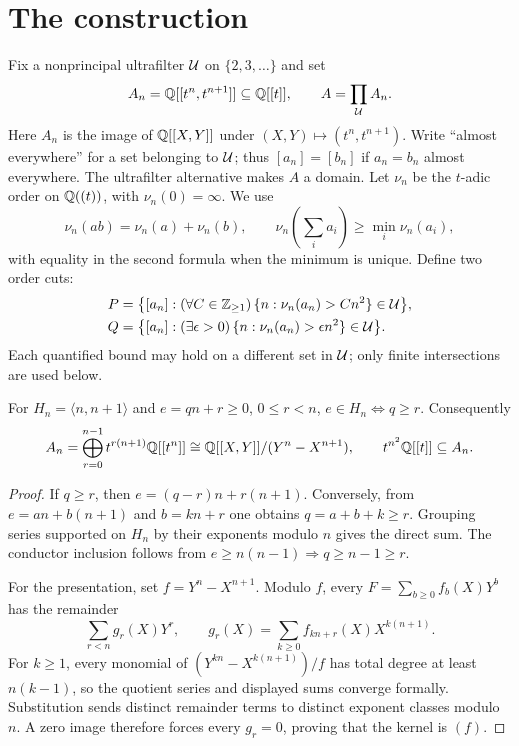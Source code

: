 \section{The construction}\label{sec:construction}

Fix a nonprincipal ultrafilter $\mathcal U$ on $\{2,3,\ldots\}$ and set
\[
 A_n=\mathbb Q[[t^n,t^{n+1}]]\subseteq\mathbb Q[[t]],\qquad
 A=\prod_{\mathcal U}A_n.
\]
Here $A_n$ is the image of $\mathbb Q[[X,Y]]$ under
$(X,Y)\mapsto(t^n,t^{n+1})$. Write ``almost everywhere'' for a set
belonging to $\mathcal U$; thus $[a_n]=[b_n]$ if $a_n=b_n$ almost everywhere.
The ultrafilter alternative makes $A$ a domain. Let $\nu_n$ be the
$t$-adic order on $\mathbb Q((t))$, with $\nu_n(0)=\infty$. We use
\[
 \nu_n(ab)=\nu_n(a)+\nu_n(b),\qquad
 \nu_n\!\left(\sum_i a_i\right)\geq\min_i\nu_n(a_i),
\]
with equality in the second formula when the minimum is unique.
Define two order cuts:
\begin{align}
 P&=\bigl\{[a_n]:(\forall C\in\mathbb Z_{\geq1})\,
                  \{n:\nu_n(a_n)>Cn^2\}\in\mathcal U\bigr\},\label{eq:P}\\
 Q&=\bigl\{[a_n]:(\exists\epsilon>0)\,
                  \{n:\nu_n(a_n)>\epsilon n^2\}\in\mathcal U\bigr\}.
                  \label{eq:Q}
\end{align}
Each quantified bound may hold on a different set in $\mathcal U$; only
finite intersections are used below.

\begin{lemma}\label{lem:curves}
For $H_n=\langle n,n+1\rangle$ and $e=qn+r\geq0$, $0\leq r<n$,
$e\in H_n\Longleftrightarrow q\geq r$. Consequently
\begin{equation}\label{eq:curve-facts}
 A_n=\bigoplus_{r=0}^{n-1}t^{r(n+1)}\mathbb Q[[t^n]]
 \cong\mathbb Q[[X,Y]]/(Y^n-X^{n+1}),\qquad
 t^{n^2}\mathbb Q[[t]]\subseteq A_n.
\end{equation}
\end{lemma}
\begin{proof}
If $q\geq r$, then $e=(q-r)n+r(n+1)$. Conversely, from
$e=an+b(n+1)$ and $b=kn+r$ one obtains $q=a+b+k\geq r$.
Grouping series supported on $H_n$ by their exponents modulo $n$
gives the direct sum. The conductor inclusion follows from
$e\geq n(n-1)\Rightarrow q\geq n-1\geq r$.

For the presentation, set $f=Y^n-X^{n+1}$. Modulo $f$, every
$F=\sum_{b\geq0}f_b(X)Y^b$ has the remainder
\[
 \sum_{r<n}g_r(X)Y^r,\qquad
 g_r(X)=\sum_{k\geq0}f_{kn+r}(X)X^{k(n+1)}.
\]
For $k\geq1$, every monomial of $(Y^{kn}-X^{k(n+1)})/f$ has total
degree at least $n(k-1)$, so the quotient series and displayed sums
converge formally. Substitution sends distinct remainder terms to distinct
exponent classes modulo $n$. A zero image therefore forces every
$g_r=0$, proving that the kernel is $(f)$.
\end{proof}

